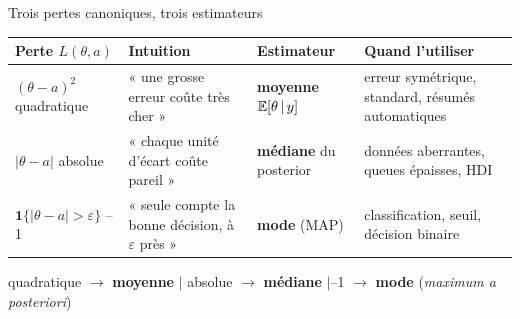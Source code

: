 \begin{frame}{Trois pertes canoniques, trois estimateurs}
\begin{center}
{\small
\begin{tabular}{@{}p{}p{}p{}p{}@{}}
\toprule
\textbf{Perte} $L(\theta,a)$ & \textbf{Intuition} & \textbf{Estimateur} & \textbf{Quand l'utiliser} \\
\midrule
$(\theta-a)^2$ \newline quadratique & « une grosse erreur coûte très cher » &
\textbf{moyenne} $\mathbb{E}[\theta \,\vert\, y]$ &
erreur symétrique, standard, résumés automatiques \\
\addlinespace
$|\theta-a|$ \newline absolue & « chaque unité d'écart coûte pareil » &
\textbf{médiane} du posterior &
données aberrantes, queues épaisses, HDI \\
\addlinespace
$\mathbf{1}\{|\theta-a| > \varepsilon\}$ \newline 0--1 & « seule compte la bonne
décision, à $\varepsilon$ près » &
\textbf{mode} (MAP) &
classification, seuil, décision binaire \\
\bottomrule
\end{tabular}}
\end{center}
\vspace{1.5mm}
\begin{ebox}
\centering\small
quadratique $\rightarrow$ \textbf{moyenne} \quad$\vert$\quad
absolue $\rightarrow$ \textbf{médiane} \quad$\vert$--1 $\rightarrow$ \textbf{mode} \;(\textit{maximum a posteriori})
\end{ebox}
\end{frame}

